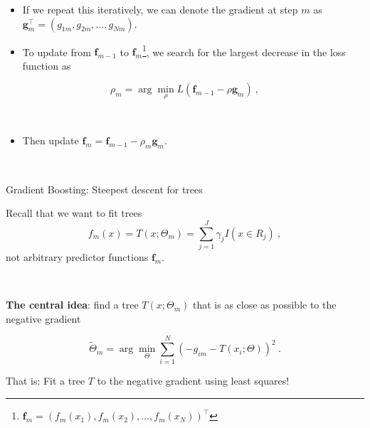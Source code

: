 \documentclass[
  10pt,
  ignorenonframetext,
]{beamer}
\providecommand{\tightlist}{%
  \setlength{\itemsep}{0pt}\setlength{\parskip}{0pt}}
\begin{document}
\begin{frame}
\begin{itemize}
\tightlist
\item
  If we repeat this iteratively, we can denote the gradient at step
  \(m\) as \(\mathbf{g}_m^\top = (g_{1m},g_{2m},\ldots, g_{Nm})\).
\end{itemize}

\vspace{2mm}

\begin{itemize}
\tightlist
\item
  To update from \(\mathbf{f}_{m-1}\) to
  \(\mathbf{f}_m\)\footnote{$\mathbf{f}_m = (f_m(x_1),f_m(x_2),\ldots, f_m(x_N))^\top$ },
  we search for the largest decrease in the loss function as
\end{itemize}

\[\rho_m = \arg \min_\rho L(\mathbf{f}_{m-1} - \rho \mathbf{g}_m) \ , \]

\(~\)

\begin{itemize}
\tightlist
\item
  Then update \(\mathbf{f}_m = \mathbf{f}_{m-1} - \rho_m \mathbf{g}_m\).
\end{itemize}

\(~\)
\end{frame}

\begin{frame}
\begin{block}{Gradient Boosting: Steepest descent for trees}
\label{gradient-boosting-steepest-descent-for-trees}
\(~\)

Recall that we want to fit trees
\[f_m(x)=T(x;\Theta_m)=\sum_{j=1}^J \gamma_j I(x\in R_j) \ , \] not
arbitrary predictor functions \(\mathbf{f}_m\).

\(~\)

\begin{tcolorbox}
\textbf{The central idea}: find a tree $T(x;\Theta_m)$ that is as close as possible to the negative gradient 

\begin{equation}
\tilde{\Theta}_m= \arg \min_\Theta \sum_{i=1}^N (-g_{im} -T(x_i;\Theta))^2 \ .
\end{equation}
\end{tcolorbox}

\vspace{8mm}

That is: Fit a tree \(T\) to the negative gradient using least squares!
\end{block}
\end{frame}
\end{document}
